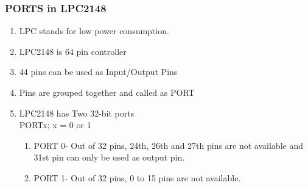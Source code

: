 \documentclass[10pt,red]{beamer}
\begin{document}
\begin{frame}
	\frametitle{PORTS in LPC2148} \pause
		\begin{enumerate}
			\item<+-|alert@+> LPC stands for low power consumption.  \\[10pt]
			\item<+-|alert@+> LPC2148 is 64 pin controller  \\[10pt]
			\item<+-|alert@+> 44 pins can be used as Input/Output Pins  \\[10pt]
			\item<+-|alert@+> Pins are grouped together and called as PORT  \\[10pt]
			\item<+-|alert@+> LPC2148 has Two 32-bit ports  \\[10pt]
				 PORTx; \hspace{2cm} x = 0 or 1\\[10pt]
				\begin{enumerate}
				 \item<+-|alert@+> PORT 0- Out of 32 pins, 24th, 26th and 27th pins are not available and 31st pin can only be used as output pin.  \\[10pt]
				 \item<+-|alert@+> PORT 1- Out of 32 pins, 0 to 15 pins are not available.  \\[10pt]
				\end{enumerate}
		\end{enumerate}
\end{frame} 
\end{document}

